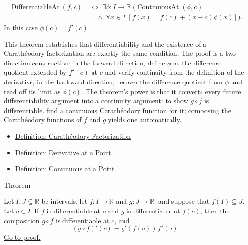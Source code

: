 \begin{remark*}
\begin{align*}
\operatorname{DifferentiableAt}(f,c)
\;&\iff\;
\exists\phi:I\to\mathbb{R}\;
\bigl(\operatorname{ContinuousAt}(\phi,c)\\
&\quad\land\;\forall x \in I\;[f(x)=f(c)+(x-c)\phi(x)]\bigr).
\end{align*}
In this case $\phi(c) = f'(c)$.
\end{remark*}

\begin{remark*}[Interpretation]
This theorem establishes that differentiability and the existence of a Carath\'{e}odory factorization are exactly the same condition. The proof is a two-direction construction: in the forward direction, define $\phi$ as the difference quotient extended by $f'(c)$ at $c$ and verify continuity from the definition of the derivative; in the backward direction, recover the difference quotient from $\phi$ and read off its limit as $\phi(c)$. The theorem's power is that it converts every future differentiability argument into a continuity argument: to show $g \circ f$ is differentiable, find a continuous Carath\'{e}odory function for it; composing the Carath\'{e}odory functions of $f$ and $g$ yields one automatically.
\end{remark*}

\begin{dependencies}
\begin{itemize}
  \item \hyperref[def:caratheodory-factorization]{Definition: Carath\'{e}odory Factorization}
  \item \hyperref[def:derivative-at-a-point]{Definition: Derivative at a Point}
  \item \hyperref[def:continuous-at-point]{Definition: Continuous at a Point}
\end{itemize}
\end{dependencies}


\begin{theorembox}{Theorem}
\begin{theorem}
\label{thm:chain-rule}
Let $I, J \subseteq \mathbb{R}$ be intervals, let $f : I \to \mathbb{R}$ and $g : J \to \mathbb{R}$, and suppose that $f(I) \subseteq J$. Let $c \in I$. If $f$ is differentiable at $c$ and $g$ is differentiable at $f(c)$, then the composition $g \circ f$ is differentiable at $c$, and
\[
(g \circ f)'(c) = g'(f(c))\,f'(c).
\]
\hyperref[prf:chain-rule]{Go to proof.}
\end{theorem}
\end{theorembox}

